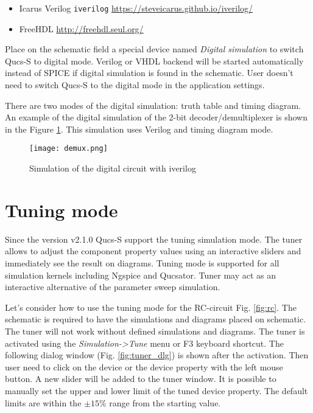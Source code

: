 \begin{itemize}
 \item Icarus Verilog \verb|iverilog| \url{https://steveicarus.github.io/iverilog/}
 \item FreeHDL \url{http://freehdl.seul.org/}
\end{itemize}


Place on the schematic field a special device named \emph{Digital simulation} to switch Qucs-S to digital mode. Verilog or VHDL backend will be started automatically instead of SPICE if digital simulation is found in the schematic. User doesn't need to switch
Qucs-S to the digital mode in the application settings.

There are two modes of the digital simulation: truth table and timing diagram. An example of the digital simulation of the 2-bit decoder/demultiplexer is shown in the Figure \ref{fig:demux}. This simulation uses Verilog and timing diagram mode.

    \begin{figure}[!ht]
    \begin{center}
        \texttt{[image: demux.png]}
    \end{center}
    \caption{Simulation of the digital circuit with iverilog} \label{fig:demux}
    \end{figure}


\section{Tuning mode}

Since the version v2.1.0 Qucs-S support the tuning simulation mode. The tuner allows to adjust the component property values using an interactive sliders and immediately see the result on diagrams. Tuning mode is supported for all simulation kernels including Ngspice and Qucsator. Tuner may act as an interactive alternative of the parameter sweep simulation.

Let's consider how to use the tuning mode for the RC-circuit Fig. \ref{fig:rc}. The schematic is required to have the simulations and diagrams placed on schematic. The tuner will not work without defined simulations and diagrams. The tuner is activated using the \emph{Simulation->Tune} menu or F3 keyboard shortcut. The following dialog window (Fig. \ref{fig:tuner_dlg}) is shown after the activation. Then user need to click on the device or the device property with the left mouse button. A new slider will be added to the tuner window. It is possible to manually set the upper and lower limit of the tuned device property. The default limits are within the $\pm15\%$ range from the starting value.



